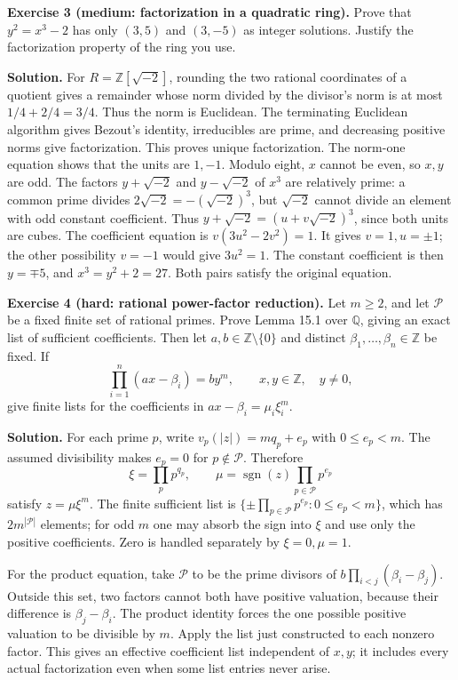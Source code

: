 \documentclass[
  11pt,
  a4paper,
]{article}
\begin{document}
\textbf{Exercise 3 (medium: factorization in a quadratic ring).} Prove
that \(y^2=x^3-2\) has only \((3,5)\) and \((3,-5)\) as integer
solutions. Justify the factorization property of the ring you use.

\textbf{Solution.} For \(R=\mathbb Z[\sqrt{-2}]\), rounding the two
rational coordinates of a quotient gives a remainder whose norm divided
by the divisor's norm is at most \(1/4+2/4=3/4\). Thus the norm is
Euclidean. The terminating Euclidean algorithm gives Bezout's identity,
irreducibles are prime, and decreasing positive norms give
factorization. This proves unique factorization. The norm-one equation
shows that the units are \(1,-1\). Modulo eight, \(x\) cannot be even,
so \(x,y\) are odd. The factors \(y+\sqrt{-2}\) and \(y-\sqrt{-2}\) of
\(x^3\) are relatively prime: a common prime divides
\(2\sqrt{-2}=-(\sqrt{-2})^3\), but \(\sqrt{-2}\) cannot divide an
element with odd constant coefficient. Thus
\(y+\sqrt{-2}=(u+v\sqrt{-2})^3\), since both units are cubes. The
coefficient equation is \(v(3u^2-2v^2)=1\). It gives \(v=1,u=\pm1\); the
other possibility \(v=-1\) would give \(3u^2=1\). The constant
coefficient is then \(y=\mp5\), and \(x^3=y^2+2=27\). Both pairs satisfy
the original equation.

\textbf{Exercise 4 (hard: rational power-factor reduction).} Let
\(m\ge2\), and let \(\mathcal P\) be a fixed finite set of rational
primes. Prove Lemma 15.1 over \(\mathbb Q\), giving an exact list of
sufficient coefficients. Then let \(a,b\in\mathbb Z\setminus\{0\}\) and
distinct \(\beta_1,\ldots,\beta_n\in\mathbb Z\) be fixed. If \[
\prod_{i=1}^n(ax-\beta_i)=by^m,\qquad x,y\in\mathbb Z,\quad y\ne0,
\] give finite lists for the coefficients in
\(ax-\beta_i=\mu_i\xi_i^m\).

\textbf{Solution.} For each prime \(p\), write \(v_p(|z|)=mq_p+e_p\)
with \(0\le e_p<m\). The assumed divisibility makes \(e_p=0\) for
\(p\notin\mathcal P\). Therefore \[
\xi=\prod_p p^{q_p},\qquad
\mu=\operatorname{sgn}(z)\prod_{p\in\mathcal P}p^{e_p}
\] satisfy \(z=\mu\xi^m\). The finite sufficient list is
\(\{\pm\prod_{p\in\mathcal P}p^{e_p}:0\le e_p<m\}\), which has
\(2m^{|\mathcal P|}\) elements; for odd \(m\) one may absorb the sign
into \(\xi\) and use only the positive coefficients. Zero is handled
separately by \(\xi=0,\mu=1\).

For the product equation, take \(\mathcal P\) to be the prime divisors
of \(b\prod_{i<j}(\beta_i-\beta_j)\). Outside this set, two factors
cannot both have positive valuation, because their difference is
\(\beta_j-\beta_i\). The product identity forces the one possible
positive valuation to be divisible by \(m\). Apply the list just
constructed to each nonzero factor. This gives an effective coefficient
list independent of \(x,y\); it includes every actual factorization even
when some list entries never arise.
\end{document}
